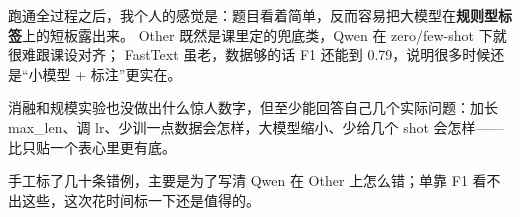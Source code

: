 \documentclass{SYSUReport}
\begin{document}
跑通全过程之后，我个人的感觉是：题目看着简单，反而容易把大模型在\textbf{规则型标签}上的短板露出来。
Other 既然是课里定的兜底类，Qwen 在 zero/few-shot 下就很难跟课设对齐；
FastText 虽老，数据够的话 F1 还能到 0.79，说明很多时候还是“小模型 + 标注”更实在。

消融和规模实验也没做出什么惊人数字，但至少能回答自己几个实际问题：加长 max\_len、调 lr、少训一点数据会怎样，大模型缩小、少给几个 shot 会怎样——比只贴一个表心里更有底。

手工标了几十条错例，主要是为了写清 Qwen 在 Other 上怎么错；单靠 F1 看不出这些，这次花时间标一下还是值得的。


\newpage


\end{document}
